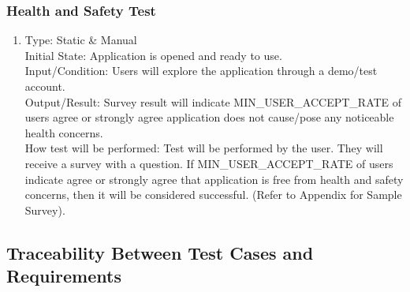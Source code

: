 \documentclass[12pt, titlepage]{article}
\begin{document}
\subsubsection{Health and Safety Test}

\begin{adjustwidth}{2.2em}{0pt}
\begin{enumerate}[{NF-HT}1.]
    \item Type: Static \& Manual\\
    Initial State: Application is opened and ready to use.\\
    Input/Condition: Users will explore the application through a demo/test account. \\
    Output/Result: Survey result will indicate MIN\_USER\_ACCEPT\_RATE of users agree or strongly agree application does not cause/pose any noticeable health concerns.\\
    How test will be performed: Test will be performed by the user. They will receive a survey with a question. If MIN\_USER\_ACCEPT\_RATE of users indicate agree or strongly agree that application is free from health and safety concerns, then it will be considered successful. (Refer to Appendix for Sample Survey).  
\end{enumerate}
\end{adjustwidth}

\subsection{Traceability Between Test Cases and Requirements}
\end{document}
